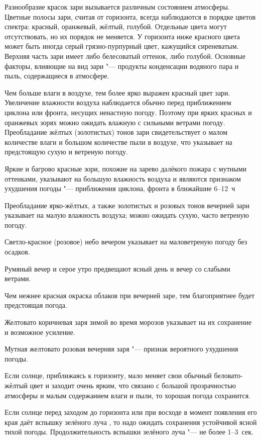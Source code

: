 Разнообразие красок зари вызывается различным состоянием
атмосферы. Цветные полосы зари, считая от горизонта, всегда
наблюдаются в порядке цветов спектра: красный, оранжевый, жёлтый,
голубой. Отдельные цвета могут отсутствовать, но их порядок не
меняется. У горизонта ниже красного цвета может быть иногда серый
грязно-пурпурный цвет, кажущийся сиреневатым. Верхняя часть зари имеет
либо белесоватый оттенок, либо голубой. Основные факторы, влияющие на
вид зари "--- продукты конденсации водяного пара и пыль, содержащиеся в
атмосфере.

Чем больше влаги в воздухе, тем более ярко выражен красный цвет
зари. Увеличение влажности воздуха наблюдается обычно перед
приближением циклона или фронта, несущих ненастную погоду. Поэтому при
ярких красных и оранжевых зорях можно ожидать влажную с сильными
ветрами погоду. Преобладание жёлтых (золотистых) тонов зари
свидетельствует о малом количестве влаги и большом количестве пыли в
воздухе, что указывает на предстоящую сухую и ветреную погоду.

 Яркие и багрово красные зори, похожие на зарево далёкого
пожара с мутными оттенками, указывают на большую влажность воздуха и
являются признаком ухудшения погоды "--- приближения циклона, фронта в
ближайшие 6--12~ч

 Преобладание ярко-жёлтых, а также золотистых и розовых тонов
вечерней зари указывает на малую влажность воздуха; можно ожидать
сухую, часто ветреную погоду.

 Светло-красное (розовое) небо вечером указывает на маловетреную
погоду без осадков.

 Румяный вечер и серое утро предвещают ясный день и вечер со
слабыми ветрами.

 Чем нежнее красная окраска облаков при вечерней заре, тем
благоприятнее будет предстоящая погода.

 Желтовато коричневая заря зимой во время морозов указывает на их
сохранение и возможное усиление.

 Мутная желтовато розовая вечерняя заря "--- признак вероятного
ухудшения погоды.

 Если солнце, приближаясь к горизонту, мало меняет свои обычный
беловато-жёлтый цвет и заходит очень ярким, что связано с большой
прозрачностью атмосферы и малым содержанием влаги и пыли, то хорошая
погода сохранится.

 Если солнце перед заходом до горизонта или при восходе в момент
появления его края даёт вспышку зелёного луча , то надо ожидать
сохранения устойчивой ясной тихой погоды. Продолжительность вспышки
зелёного луча "--- не более 1--3~сек.


